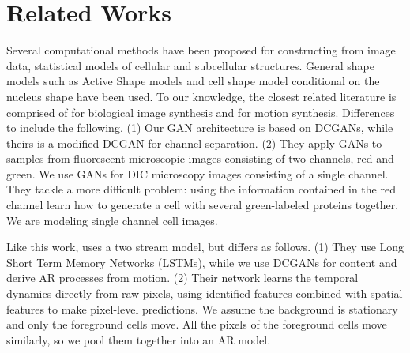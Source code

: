 \documentclass{article}
\newcommand{\squeezeup}{\vspace{-2.5mm}}
\begin{document}
\section{Related Works}
\squeezeup
\vspace{-1.5mm}
Several computational methods have been proposed for constructing from image data, statistical models of cellular and subcellular structures. General shape models such as Active Shape models \cite{Cootes:1995:ASM:206543.206547} and cell shape model conditional on the nucleus shape \cite{zhao2007automated} have been used. To our knowledge, the closest related literature is comprised of \cite{osokin2017biogans} for biological image synthesis and \cite{DBLP:journals/corr/VillegasYHLL17} for motion synthesis. Differences to \cite{osokin2017biogans} include the following. (1) Our GAN architecture is based on DCGANs, while theirs is a modified DCGAN for channel separation. (2) They apply GANs to samples from fluorescent microscopic images consisting of two channels, red and green. We use GANs for DIC microscopy images consisting of a single channel. They tackle a more difficult problem: using the information contained in the red channel learn how to generate a cell with several green-labeled proteins together. We are modeling single channel cell images. \par
Like this work, \cite{DBLP:journals/corr/VillegasYHLL17} uses a two stream model, but differs as follows. (1) They use Long Short Term Memory Networks (LSTMs), while we use DCGANs for content and derive AR processes from motion. (2) Their network learns the temporal dynamics directly from raw pixels, using identified features combined with spatial features to make pixel-level predictions. We assume the background is stationary and only the foreground cells move. All the pixels of the foreground cells move similarly, so we pool them together into an AR model.\par
\vspace{-0.2cm}
\end{document}
